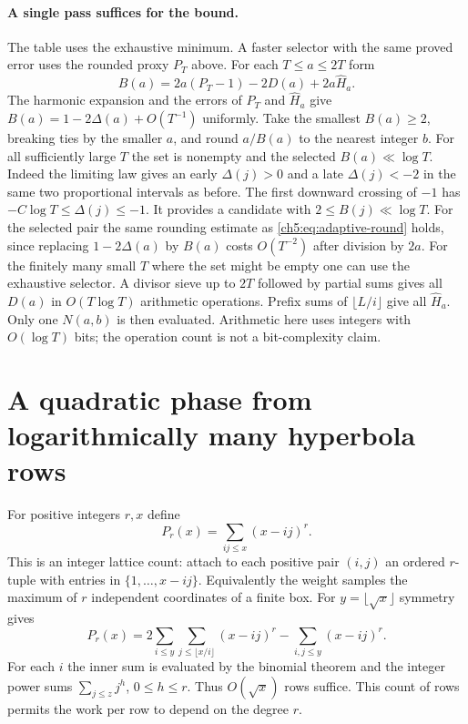 \documentclass[11pt,a4paper,oneside,openany]{report}
\theoremstyle{remark}\newtheorem{remark}[theorem]{Remark}
\numberwithin{equation}{section}
\begin{document}
\paragraph{A single pass suffices for the bound.}
The table uses the exhaustive minimum. A faster selector with the same proved error uses the rounded proxy $P_T$ above. For each $T\le a\le2T$ form
\[
 B(a)=2a(P_T-1)-2D(a)+2a\widehat H_a .
\]
The harmonic expansion and the errors of $P_T$ and $\widehat H_a$ give $B(a)=1-2\Delta(a)+O(T^{-1})$ uniformly. Take the smallest $B(a)\ge2$, breaking ties by the smaller $a$, and round $a/B(a)$ to the nearest integer $b$. For all sufficiently large $T$ the set is nonempty and the selected $B(a)\ll\log T$. Indeed the limiting law gives an early $\Delta(j)>0$ and a late $\Delta(j)<-2$ in the same two proportional intervals as before. The first downward crossing of $-1$ has $-C\log T\le\Delta(j)\le-1$. It provides a candidate with $2\le B(j)\ll\log T$. For the selected pair the same rounding estimate as \eqref{ch5:eq:adaptive-round} holds, since replacing $1-2\Delta(a)$ by $B(a)$ costs $O(T^{-2})$ after division by $2a$. For the finitely many small $T$ where the set might be empty one can use the exhaustive selector. A divisor sieve up to $2T$ followed by partial sums gives all $D(a)$ in $O(T\log T)$ arithmetic operations. Prefix sums of $\lfloor L/i\rfloor$ give all $\widehat H_a$. Only one $N(a,b)$ is then evaluated. Arithmetic here uses integers with $O(\log T)$ bits; the operation count is not a bit-complexity claim.

\section{A quadratic phase from logarithmically many hyperbola rows}
\label{ch5:px:section}

For positive integers $r,x$ define
\[
 P_r(x)=\sum_{ij\le x}(x-ij)^r .
\]
This is an integer lattice count: attach to each positive pair $(i,j)$
an ordered $r$-tuple with entries in $\{1,\ldots,x-ij\}$.
Equivalently the weight samples the maximum of $r$ independent coordinates
of a finite box. For $y=\lfloor\sqrt x\rfloor$ symmetry gives
\begin{equation}\label{ch5:px:hyper}
 P_r(x)=2\sum_{i\le y}\sum_{j\le\lfloor x/i\rfloor}(x-ij)^r
                 -\sum_{i,j\le y}(x-ij)^r.
\end{equation}
For each $i$ the inner sum is evaluated by the binomial theorem and
the integer power sums $\sum_{j\le z}j^h$, $0\le h\le r$.
Thus $O(\sqrt x)$ rows suffice. This count of rows permits the
work per row to depend on the degree $r$.
\end{document}
